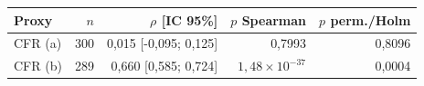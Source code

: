 \begin{tabular}{lrrrr}
\hline
Proxy & $n$ & $\rho$ [IC 95\%] & $p$ Spearman & $p$ perm./Holm \\
\hline
CFR (a) & 300 & 0,015 [-0,095; 0,125] & 0,7993 & 0,8096 \\
CFR (b) & 289 & 0,660 [0,585; 0,724] & $1,48\times 10^{-37}$ & 0,0004 \\
\hline
\end{tabular}
